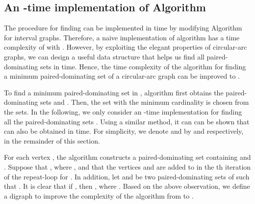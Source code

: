 \documentclass[12pt]{article}
\begin{document}
\medskip
\subsection{An -time implementation of Algorithm 
                              \label{section:implement-arc}}
The procedure for finding  can be implemented in  time
by modifying Algorithm  for interval graphs. Therefore, a naive
implementation of algorithm  has a time complexity of 
with . However, by exploiting the elegant properties of
circular-arc graphs, we can design a useful data structure that
helps us find all paired-dominating sets  in
 time. Hence, the time complexity of the algorithm for
finding a minimum paired-dominating set of a circular-arc graph
can be improved to .

To find a minimum paired-dominating set  in , algorithm 
first obtains the paired-dominating sets
 and . Then,
the set  with the minimum cardinality is chosen from the sets.
In the following, we only consider an -time implementation
for finding all the paired-dominating sets
. Using a similar method, it can can be
shown that  can also be obtained in
 time. For simplicity, we denote  and  by
 and  respectively, in the remainder of this section.

For each vertex , the algorithm constructs a
paired-dominating set  containing  and . Suppose
that , where , and that the vertices  and
 are added to  in the th iteration of the
repeat-loop for . In addition, let
 and
 be
two paired-dominating sets of  such that . It is clear that if , then 
, where . Based on the
above observation, we define a digraph  to improve the
complexity of the algorithm from  to .

\vspace{14pt}
\end{document}
